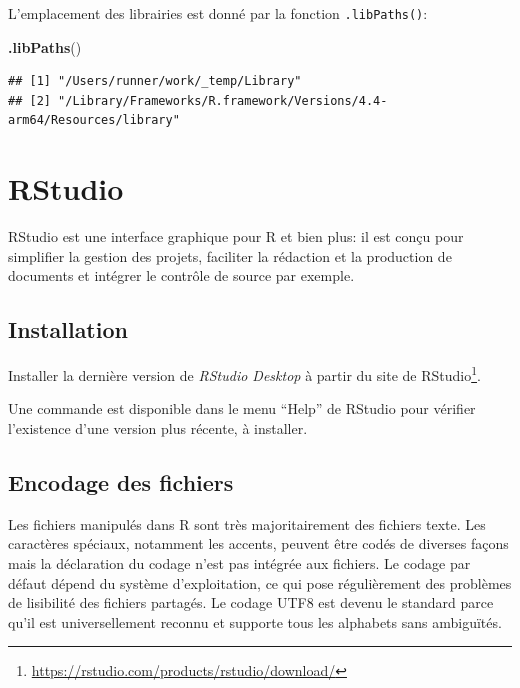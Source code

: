 \documentclass[
  12pt,
  french,
  a4paper,
  extrafontsizes,onecolumn,openright
  ]{memoir}
\newenvironment{Shaded}{\begin{snugshade}}{\end{snugshade}}
\newcommand{\FunctionTok}[1]{\textcolor[rgb]{0.13,0.29,0.53}{\textbf{#1}}}
\newcommand{\NormalTok}[1]{#1}
\newlength{\rf}
\begin{document}
L'emplacement des librairies est donné par la fonction \texttt{.libPaths()}:

\scriptsize

\begin{Shaded}
\begin{Highlighting}[]
\FunctionTok{.libPaths}\NormalTok{()}
\end{Highlighting}
\end{Shaded}

\begin{verbatim}
## [1] "/Users/runner/work/_temp/Library"                                    
## [2] "/Library/Frameworks/R.framework/Versions/4.4-arm64/Resources/library"
\end{verbatim}

\normalsize

\section{RStudio}\label{rstudio}

RStudio est une interface graphique pour R et bien plus: il est conçu pour simplifier la gestion des projets, faciliter la rédaction et la production de documents et intégrer le contrôle de source par exemple.

\subsection{Installation}\label{installation-1}

Installer la dernière version de \emph{RStudio Desktop} à partir du site de RStudio\footnote{\url{https://rstudio.com/products/rstudio/download/}}.

Une commande est disponible dans le menu \enquote{Help} de RStudio pour vérifier l'existence d'une version plus récente, à installer.

\subsection{Encodage des fichiers}\label{encodage-des-fichiers}

Les fichiers manipulés dans R sont très majoritairement des fichiers texte.
Les caractères spéciaux, notamment les accents, peuvent être codés de diverses façons mais la déclaration du codage n'est pas intégrée aux fichiers.
Le codage par défaut dépend du système d'exploitation, ce qui pose régulièrement des problèmes de lisibilité des fichiers partagés.
Le codage UTF8 est devenu le standard parce qu'il est universellement reconnu et supporte tous les alphabets sans ambiguïtés.
\end{document}
